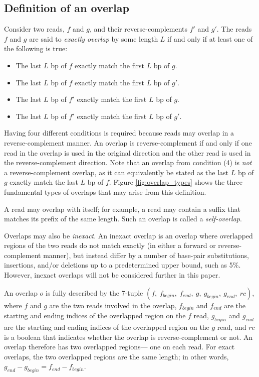 \documentclass[10pt]{article}
\newcommand{\LengthVar}{L}
\newcommand{\Figure}[1]{Figure \ref{#1}}
\newcommand{\KeyTerm}[1]{{\it #1}}
\begin{document}
\subsection{Definition of an overlap}
	Consider two reads, $f$ and $g$, and their reverse-complements $f'$ and
	$g'$.  The reads $f$ and $g$ are said to \KeyTerm{exactly overlap} by some
	length $\LengthVar$ if and only if at least one of the following is true:
	\begin{itemize}
		\item The last $\LengthVar$ bp of $f$ exactly match the first
		$\LengthVar$ bp of $g$.
		\item The last $\LengthVar$ bp of $f$ exactly match the first
		$\LengthVar$ bp of $g'$.
		\item The last $\LengthVar$ bp of $f'$ exactly match the first
		$\LengthVar$ bp of $g$.
		\item The last $\LengthVar$ bp of $f'$ exactly match the first
		$\LengthVar$ bp of $g'$.
	\end{itemize}

Having four different conditions is required because reads may overlap in a
reverse-complement manner.  An overlap is reverse-complement if and only if one
read in the overlap is used in the original direction and the other read is used
in the reverse-complement direction.  Note that an overlap from condition (4) is
{\em not} a reverse-complement overlap, as it can equivalently be stated as the
last $\LengthVar$ bp of $g$ exactly match the last $\LengthVar$ bp of $f$.
\Figure{fig:overlap_types} shows the three fundamental types of overlaps that
may arise from this definition.

A read may overlap with itself; for example, a read may contain a suffix that
matches its prefix of the same length.  Such an overlap is called a
\KeyTerm{self-overlap}.

Overlaps may also be \KeyTerm{inexact}.  An inexact overlap is an overlap where
overlapped regions of the two reads do not match exactly (in either a forward or
reverse-complement manner), but instead differ by a number of base-pair
substitutions, insertions, and/or deletions up to a predetermined upper bound,
such as 5\%.  However, inexact overlaps will not be considered further in this
paper.

An overlap $o$ is fully described by the 7-tuple $(f,\ f_{begin},\ f_{end},\ g,
\ g_{begin},\ g_{end},\ rc)$, where $f$ and $g$ are the two reads involved in the
overlap, $f_{begin}$ and $f_{end}$ are the starting and ending indices of the
overlapped region on the $f$ read, $g_{begin}$ and $g_{end}$ are the starting
and ending indices of the overlapped region on the $g$ read, and $rc$ is a
boolean that indicates whether the overlap is reverse-complement or not.  An
overlap therefore has two overlapped regions--- one on each read.  For exact
overlaps, the two overlapped regions are the same length; in other words,
$g_{end} - g_{begin} = f_{end} - f_{begin}$.
\end{document}
